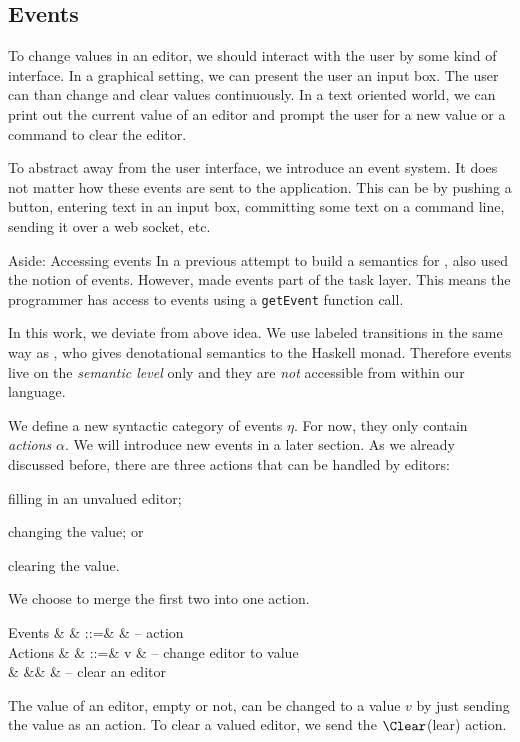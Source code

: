 \subsection{Events}

To change values in an editor,
we should interact with the user by some kind of interface.
In a graphical setting,
we can present the user an input box.
The user can than change and clear values continuously.
In a text oriented world,
we can print out the current value of an editor
and prompt the user for a new value
or a command to clear the editor.

To abstract away from the user interface,
we introduce an event system.
It does not matter how these events are sent to the application.
This can be by pushing a button,
entering text in an input box,
committing some text on a command line,
sending it over a web socket,
etc.

\begin{margintext}{Aside: Accessing events}
In a previous attempt to build a semantics for \TOP,
\textcite{theses/radboud/VinterHviid18} also used the notion of events.
However, \citeauthor{theses/radboud/VinterHviid18} made events part of the task layer.
This means the programmer has access to events using a \texttt{getEvent} function call.

In this work,
we deviate from above idea.
We use labeled transitions in the same way as \textcite{school/maktoberdorf/PeytonJones01},
who gives denotational semantics to the Haskell \IO monad.
Therefore events live on the \emph{semantic level} only
and they are \emph{not} accessible from within our language.
\end{margintext}

We define a new syntactic category of events $\eta$.
For now, they only contain \emph{actions} $\alpha$.
We will introduce new events in a later section.
As we already discussed before,
there are three actions that can be handled by editors:
\begin{enumerate*}
  \item filling in an unvalued editor;
  \item changing the value; or
  \item clearing the value.
\end{enumerate*}
We choose to merge the first two into one action.
\begin{grammar}
  Events
    & \eta   & ::=& \alpha & – action \\
  Actions
    & \alpha & ::=& v      & – change editor to value \\
    &        &\mid& \Clear & – clear an editor \\
\end{grammar}
The value of an editor, empty or not, can be changed to a value $v$ by just sending the value as an action.
To clear a valued editor, we send the $\Clear$(lear) action.

